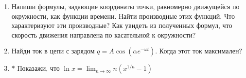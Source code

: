 \begin{enumerate}
    \item Напиши формулы, задающие координаты точки, равномерно движущейся по окружности, как функции времени. Найти производные этих функций. Что характеризуют эти производные? Как увидеть из полученных формул, что скорость движения направлена по касательной к окружности?
    \item Найди ток в цепи с зарядом $q = A \cos (\alpha e^{-\omega t})$. Когда этот ток максимален?
    \item $\boldsymbol{*}$ Показажи, что $\displaystyle\ln x = \lim_{n \rightarrow \infty} n (x^{1/n} - 1)$
\end{enumerate}